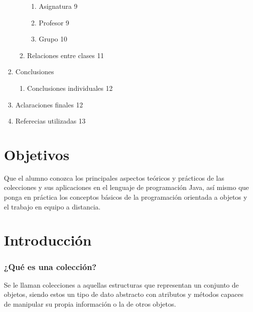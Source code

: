 \documentclass[12pt]{report}
\begin{document}
\begin{enumerate}
\begin{enumerate}
\begin{enumerate}
            \item Asignatura \hfill 9
            \item Profesor \hfill 9
            \item Grupo \hfill 10
        \end{enumerate}
        \item Relaciones entre clases \hfill 11
    \end{enumerate}
    \item Conclusiones 
    \begin{enumerate}
        \item Conclusiones individuales \hfill 12
    \end{enumerate}
    \item Aclaraciones finales \hfill 12
    \item Referecias utilizadas \hfill 13
\end{enumerate}

\newpage %


\section*{Objetivos}

Que el alumno conozca los principales aspectos teóricos y prácticos de las colecciones y sus aplicaciones en el lenguaje de programación Java, así mismo que ponga en práctica los conceptos básicos de la programación orientada a objetos y el trabajo en equipo a distancia.


\section*{Introducción}
\subsubsection{¿Qué es una colección?}
Se le llaman colecciones a aquellas estructuras que representan un conjunto de objetos, siendo estos un tipo de dato abstracto con atributos y métodos capaces de manipular su propia información o la de otros objetos. \cite{Schildt}
\end{document}
